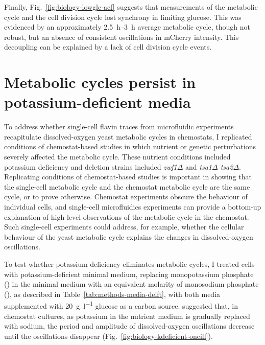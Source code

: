 Finally, Fig.\ \ref{fig:biology-lowglc-acf} suggests that measurements of the metabolic cycle and the cell division cycle lost synchrony in limiting glucose.
This was evidenced by an approximately \SIrange{2.5}{3}{\hour} average metabolic cycle, though not robust, but an absence of consistent oscillations in mCherry intensity.
This decoupling can be explained by a lack of cell division cycle events.




\section{Metabolic cycles persist in potassium-deficient media}
\label{sec:biology-potassium_deficient}

To address whether single-cell flavin traces from microfluidic experiments recapitulate dissolved-oxygen yeast metabolic cycles in chemostats, I replicated conditions of chemostat-based studies in which nutrient or genetic perturbations severely affected the metabolic cycle.
These nutrient conditions included potassium deficiency and deletion strains included \textit{zwf1$\Delta$} and \textit{tsa1$\Delta$ tsa2$\Delta$}.
Replicating conditions of chemostat-based studies is important in showing that the single-cell metabolic cycle and the chemostat metabolic cycle are the same cycle, or to prove otherwise.
Chemostat experiments obscure the behaviour of individual cells, and single-cell microfluidics experiments can provide a bottom-up explanation of high-level observations of the metabolic cycle in the chemostat. Such single-cell experiments could address, for example, whether the cellular behaviour of the yeast metabolic cycle explains the changes in dissolved-oxygen oscillations.

To test whether potassium deficiency eliminates metabolic cycles, I treated cells with potassium-deficient minimal medium, replacing monopotassium phosphate () in the minimal medium with an equivalent molarity of monosodium phosphate (), as described in Table~\ref{tab:methods-media-delft}, with both media supplemented with \SI{20}{\gram~\litre^{-1}} glucose as a carbon source.
\textcite{oneillEukaryoticCellBiology2020} suggested that, in chemostat cultures, as potassium in the nutrient medium is gradually replaced with sodium, the period and amplitude of dissolved-oxygen oscillations decrease until the oscillations disappear (Fig.\ \ref{fig:biology-kdeficient-oneill}).

